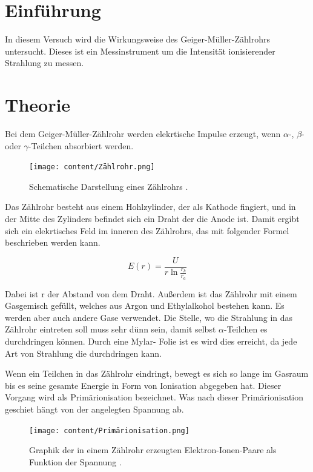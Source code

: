 \section{Einführung}
In diesem Versuch wird die Wirkungsweise des Geiger-Müller-Zählrohrs untersucht.
Dieses ist ein Messinstrument um die Intensität ionisierender Strahlung zu messen.

\section{Theorie}

Bei dem Geiger-Müller-Zählrohr werden elekrtische Impulse erzeugt, wenn $\alpha$-,
$\beta$- oder $\gamma$-Teilchen absorbiert werden.

\begin{figure}[H]
  \centering
  \texttt{[image: content/Zählrohr.png]}
  \caption{Schematische Darstellung eines Zählrohrs \cite{1}.}
  \label{abb:1}
\end{figure}

Das Zählrohr besteht aus einem Hohlzylinder, der als Kathode fingiert, und in der
Mitte des Zylinders befindet sich ein Draht der die Anode ist. Damit ergibt sich
ein elekrtisches Feld im inneren des Zählrohrs, das mit folgender Formel beschrieben
werden kann.

\begin{equation*}
  E(r) = \frac{U}{r \ln{\frac{r_k}{r_a}}}
\end{equation*}

Dabei ist r der Abstand von dem Draht. Außerdem ist das Zählrohr mit einem Gasgemisch
gefüllt, welches aus Argon und Ethylalkohol bestehen kann. Es werden aber auch andere
Gase verwendet. Die Stelle, wo die Strahlung in das Zählrohr eintreten soll muss sehr
dünn sein, damit selbst $\alpha$-Teilchen es durchdringen können. Durch eine Mylar-
Folie ist es wird dies erreicht, da jede Art von Strahlung die durchdringen kann.

Wenn ein Teilchen in das Zählrohr eindringt, bewegt es sich so lange im Gasraum bis
es seine gesamte Energie in Form von Ionisation abgegeben hat. Dieser Vorgang wird als
Primärionisation bezeichnet. Was nach dieser Primärionisation geschiet hängt von der
angelegten Spannung ab.

\begin{figure}[H]
  \centering
  \texttt{[image: content/Primärionisation.png]}
  \caption{Graphik der in einem Zählrohr erzeugten Elektron-Ionen-Paare als Funktion
  der Spannung \cite{1}.}
  \label{abb:2}
\end{figure}


